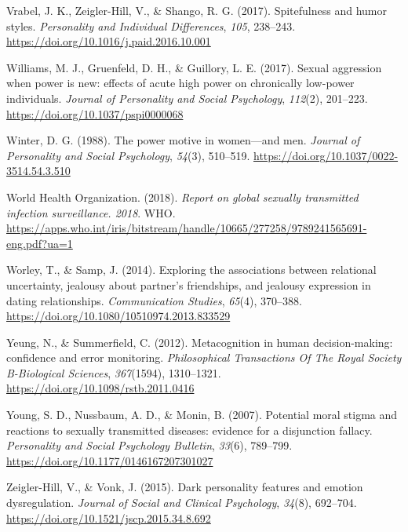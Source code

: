 \documentclass[
  english,
  donotrepeattitle,doc, 12pt, a4paper,floatsintext]{apa7}
\newlength{\cslhangindent}
\newlength{\cslentryspacingunit} %
\newenvironment{CSLReferences}[2] %
 {%
  \setlength{\parindent}{0pt}
  \ifodd #1
  \let\oldpar\par
  \def\par{\hangindent=\cslhangindent\oldpar}
  \fi
  \setlength{\parskip}{#2\cslentryspacingunit}
 }%
 {}
\begin{document}
\begin{CSLReferences}{1}{0}
\leavevmode{}%
Vrabel, J. K., Zeigler-Hill, V., \& Shango, R. G. (2017). Spitefulness and humor styles. \emph{Personality and Individual Differences}, \emph{105}, 238--243. \url{https://doi.org/10.1016/j.paid.2016.10.001}

\leavevmode{}%
Williams, M. J., Gruenfeld, D. H., \& Guillory, L. E. (2017). Sexual aggression when power is new: effects of acute high power on chronically low-power individuals. \emph{Journal of Personality and Social Psychology}, \emph{112}(2), 201--223. \url{https://doi.org/10.1037/pspi0000068}

\leavevmode{}%
Winter, D. G. (1988). The power motive in women---and men. \emph{Journal of Personality and Social Psychology}, \emph{54}(3), 510--519. \url{https://doi.org/10.1037/0022-3514.54.3.510}

\leavevmode{}%
World Health Organization. (2018). \emph{Report on global sexually transmitted infection surveillance. 2018}. WHO. \url{https://apps.who.int/iris/bitstream/handle/10665/277258/9789241565691-eng.pdf?ua=1}

\leavevmode{}%
Worley, T., \& Samp, J. (2014). Exploring the associations between relational uncertainty, jealousy about partner's friendships, and jealousy expression in dating relationships. \emph{Communication Studies}, \emph{65}(4), 370--388. \url{https://doi.org/10.1080/10510974.2013.833529}

\leavevmode{}%
Yeung, N., \& Summerfield, C. (2012). Metacognition in human decision-making: confidence and error monitoring. \emph{Philosophical Transactions Of The Royal Society B-Biological Sciences}, \emph{367}(1594), 1310--1321. \url{https://doi.org/10.1098/rstb.2011.0416}

\leavevmode{}%
Young, S. D., Nussbaum, A. D., \& Monin, B. (2007). Potential moral stigma and reactions to sexually transmitted diseases: evidence for a disjunction fallacy. \emph{Personality and Social Psychology Bulletin}, \emph{33}(6), 789--799. \url{https://doi.org/10.1177/0146167207301027}

\leavevmode{}%
Zeigler-Hill, V., \& Vonk, J. (2015). Dark personality features and emotion dysregulation. \emph{Journal of Social and Clinical Psychology}, \emph{34}(8), 692--704. \url{https://doi.org/10.1521/jscp.2015.34.8.692}

\end{CSLReferences}

\endgroup

\newpage
\end{document}
